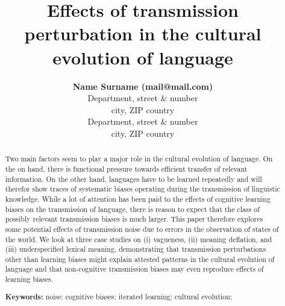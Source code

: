 \documentclass[10pt,a4paper]{article}
\title{Effects of transmission perturbation in the cultural evolution of language}
\author{{\large \bf Name Surname (mail@mail.com)} \\
  Department, street \& number \\
  city, ZIP country
  \AND {\large \bf Name Surname (mail@mail.com)} \\
  Department, street \& number \\
  city, ZIP country}
\begin{document}
\maketitle

\begin{abstract}
  Two main factors seem to play a major role in the cultural evolution of language. On the on
  hand, there is functional pressure towards efficient transfer of relevant information. On the
  other hand, languages have to be learned repeatedly and will therefor show traces of
  systematic biases operating during the transmission of linguistic knowledge. While a lot of
  attention has been paid to the effects of cognitive learning biases on the transmission of
  language, there is reason to expect that the class of possibly relevant transmission biases
  is much larger. This paper therefore explores some potential effects of transmission noise
  due to errors in the observation of states of the world. We look at three case studies on (i)
  vagueness, (ii) meaning deflation, and (iii) underspecified lexical meaning, demonstrating
  that transmission perturbations other than learning biases might explain attested patterns in
  the cultural evolution of language and that non-cognitive transmission biases may even
  reproduce effects of learning biases.

\textbf{Keywords:} 
noise; cognitive biases; iterated learning; cultural evolution;  
\end{abstract}
\end{document}
